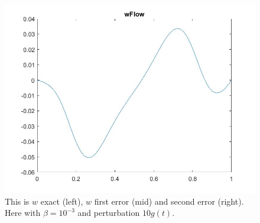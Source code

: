 \documentclass[11pt, a4paper]{article}
\theoremstyle{definition}
\begin{document}
\begin{figure}[h]
	\includegraphics[scale=0.3]{linNwerr2.jpg}
	\caption{This is $w$ exact (left), $w$ first error (mid) and second error (right). Here with $\beta =10^{-3}$ and perturbation $10g(t)$.}
	\label{Figlint3a}
\end{figure}
\end{document}
